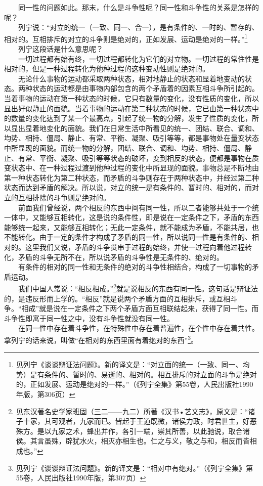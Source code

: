 \documentclass[cn,11pt,chinese]{elegantbook}
\begin{document}
　　同一性的问题如此。那末，什么是斗争性呢？同一性和斗争性的关系是怎样的呢？\\
　　列宁说：“对立的统一（一致、同一、合一），是有条件的、一时的、暂存的、相对的。互相排斥的对立的斗争则是绝对的，正如发展、运动是绝对的一样。”\footnote[33]{ 见列宁《谈谈辩证法问题》。新的译文是：“对立面的统一（一致、同一、均势）是有条件的、暂时的、易逝的、相对的。相互排斥的对立面的斗争是绝对的，正如发展、运动是绝对的一样。”（《列宁全集》第55卷，人民出版社1990年版，第306页）}\\
　　列宁这段话是什么意思呢？\\
　　一切过程都有始有终，一切过程都转化为它们的对立物。一切过程的常住性是相对的，但是一种过程转化为他种过程的这种变动性则是绝对的。\\
　　无论什么事物的运动都采取两种状态，相对地静止的状态和显着地变动的状态。两种状态的运动都是由事物内部包含的两个矛盾着的因素互相斗争所引起的。当着事物的运动在第一种状态的时候，它只有数量的变化，没有性质的变化，所以显出好似静止的面貌。当着事物的运动在第二种状态的时候，它已由第一种状态中的数量的变化达到了某一个最高点，引起了统一物的分解，发生了性质的变化，所以显出显着地变化的面貌。我们在日常生活中所看见的统一、团结、联合、调和、均势、相持、僵局、静止、有常、平衡、凝聚、吸引等等，都是事物处在量变状态中所显现的面貌。而统一物的分解，团结、联合、调和、均势、相持、僵局、静止、有常、平衡、凝聚、吸引等等状态的破坏，变到相反的状态，便都是事物在质变状态中、在一种过程过渡到他种过程的变化中所显现的面貌。事物总是不断地由第一种状态转化为第二种状态，而矛盾的斗争则存在于两种状态中，并经过第二种状态而达到矛盾的解决。所以说，对立的统一是有条件的、暂时的、相对的，而对立的互相排除的斗争则是绝对的。\\
　　前面我们曾经说，两个相反的东西中间有同一性，所以二者能够共处于一个统一体中，又能够互相转化，这是说的条件性，即是说在一定条件之下，矛盾的东西能够统一起来，又能够互相转化；无此一定条件，就不能成为矛盾，不能共居，也不能转化。由于一定的条件才构成了矛盾的同一性，所以说同一性是有条件的、相对的。这里我们又说，矛盾的斗争贯串于过程的始终，并使一过程向着他过程转化，矛盾的斗争无所不在，所以说矛盾的斗争性是无条件的、绝对的。\\
　　有条件的相对的同一性和无条件的绝对的斗争性相结合，构成了一切事物的矛盾运动。\\
　　我们中国人常说：“相反相成。”\footnote[34]{ 见东汉著名史学家班固（三二——九二）所著《汉书•艺文志》，原文是：“诸子十家，其可观者，九家而已。皆起于王道既微，诸侯力政，时君世主，好恶殊方。是以九家之术，蜂出并作，各引一端，崇其所善，以此驰说，取合诸侯。其言虽殊，辟犹水火，相灭亦相生也。仁之与义，敬之与和，相反而皆相成也。”}就是说相反的东西有同一性。这句话是辩证法的，是违反形而上学的。“相反”就是说两个矛盾方面的互相排斥，或互相斗争。“相成”就是说在一定条件之下两个矛盾方面互相联结起来，获得了同一性。而斗争性即寓于同一性之中，没有斗争性就没有同一性。\\
　　在同一性中存在着斗争性，在特殊性中存在着普遍性，在个性中存在着共性。拿列宁的话来说，叫做“在相对的东西里面有着绝对的东西”\footnote[35]{ 见列宁《谈谈辩证法问题》。新的译文是：“相对中有绝对。”（《列宁全集》第55卷，人民出版社1990年版，第307页）}。\\
\end{document}
